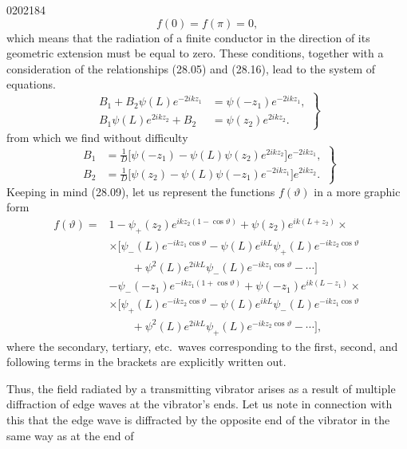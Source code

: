 \begin{scanpage}{0202}{184}
\[f(0)=f(\pi)=0,\tag{29.04}\]
which means that the radiation of a finite conductor in the direction of its geometric extension must be equal to zero. These conditions, together with a consideration of the relationships (28.05) and (28.16), lead to the system of equations.
\[
\left.\begin{aligned}
B_1+B_2\psi(L)e^{-2ikz_1}&=\psi(-z_1)e^{-2ikz_1},\\
B_1\psi(L)e^{2ikz_2}+B_2&=\psi(z_2)e^{2ikz_2}.
\end{aligned}\right\}\tag{29.05}
\]
from which we find without difficulty
\[
\left.\begin{aligned}
B_1&=\frac1D\bigl[\psi(-z_1)-\psi(L)\psi(z_2)e^{2ikz_2}\bigr]e^{-2ikz_1},\\
B_2&=\frac1D\bigl[\psi(z_2)-\psi(L)\psi(-z_1)e^{-2ikz_1}\bigr]e^{2ikz_2}.
\end{aligned}\right\}\tag{29.06}
\]
Keeping in mind (28.09), let us represent the functions $f(\vartheta)$ in a more graphic form
\[
\begin{aligned}
f(\vartheta)={}&1-\psi_+(z_2)e^{ikz_2(1-\cos\vartheta)}+\psi(z_2)e^{ik(L+z_2)}\times\\
&\times\bigl[\psi_-(L)e^{-ikz_1\cos\vartheta}-\psi(L)e^{ikL}\psi_+(L)e^{-ikz_2\cos\vartheta}\\
&\qquad+\psi^2(L)e^{2ikL}\psi_-(L)e^{-ikz_1\cos\vartheta}-\cdots\bigr]\\
&-\psi_-(-z_1)e^{-ikz_1(1+\cos\vartheta)}+\psi(-z_1)e^{ik(L-z_1)}\times\\
&\times\bigl[\psi_+(L)e^{-ikz_2\cos\vartheta}-\psi(L)e^{ikL}\psi_-(L)e^{-ikz_1\cos\vartheta}\\
&\qquad+\psi^2(L)e^{2ikL}\psi_+(L)e^{-ikz_2\cos\vartheta}-\cdots\bigr],
\end{aligned}\tag{29.07}
\]
where the secondary, tertiary, etc.\ waves corresponding to the first, second, and following terms in the brackets are explicitly written out.

Thus, the field radiated by a transmitting vibrator arises as a result of multiple diffraction of edge waves at the vibrator's ends. Let us note in connection with this that the edge wave is diffracted by the opposite end of the vibrator in the same way as at the end of
\end{scanpage}
